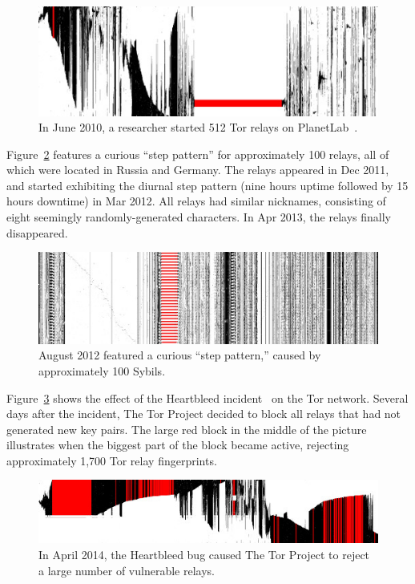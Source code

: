 \begin{figure}[t]
	\centering
	\includegraphics[width=\linewidth]{diagrams/2010-06.jpg}
	\caption{In June 2010, a researcher started 512 Tor relays on
		PlanetLab~\cite{progressreport}.}
	\label{fig:2010-06-planetlab}
\end{figure}

Figure~\ref{fig:2012-08-steppattern} features a curious ``step pattern'' for
approximately 100 relays, all of which were located in Russia and Germany.  The
relays appeared in Dec 2011, and started exhibiting the diurnal step
pattern (nine hours uptime followed by 15 hours downtime) in Mar 2012.  All
relays had similar nicknames, consisting of eight seemingly randomly-generated
characters.  In Apr 2013, the relays finally disappeared.

\begin{figure}[t]
	\centering
	\includegraphics[width=\linewidth]{diagrams/2012-08.jpg}
	\caption{August 2012 featured a curious ``step pattern,'' caused by
	approximately 100 Sybils.}
	\label{fig:2012-08-steppattern}
\end{figure}

Figure~\ref{fig:2014-04-heartbleed} shows the effect of the Heartbleed
incident~\cite{Durumeric2014a} on the Tor network.  Several days after the
incident, The Tor Project decided to block all relays that had not generated new
key pairs.  The large red block in the middle of the picture illustrates when
the biggest part of the block became active, rejecting approximately 1,700 Tor
relay fingerprints.

\begin{figure}[t]
	\centering
	\includegraphics[width=\linewidth]{diagrams/2014-04.jpg}
	\caption{In April 2014, the Heartbleed bug caused The Tor Project to reject
	a large number of vulnerable relays.}
	\label{fig:2014-04-heartbleed}
\end{figure}

